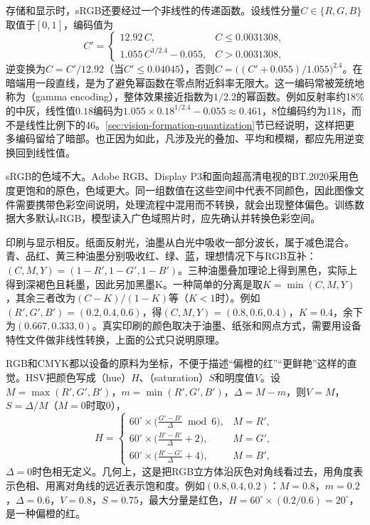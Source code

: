 存储和显示时，sRGB还要经过一个非线性的传递函数。设线性分量$C\in\{R,G,B\}$取值于$[0,1]$，编码值为
\begin{equation}
  C'=\begin{cases}
    12.92\,C, & C\le0.0031308,\\
    1.055\,C^{1/2.4}-0.055, & C>0.0031308,
  \end{cases}
  \label{eq:vision-formation-srgb}
\end{equation}
逆变换为$C=C'/12.92$（当$C'\le0.04045$），否则$C=\bigl((C'+0.055)/1.055\bigr)^{2.4}$。在暗端用一段直线，是为了避免幂函数在零点附近斜率无限大。这一编码常被笼统地称为（gamma encoding），整体效果接近指数为$1/2.2$的幂函数。例如反射率约18\%的中灰，线性值$0.18$编码为$1.055\times0.18^{1/2.4}-0.055\approx0.461$，8位编码约为118，而不是线性比例下的46。\ref{sec:vision-formation-quantization}节已经说明，这样把更多编码留给了暗部。也正因为如此，凡涉及光的叠加、平均和模糊，都应先用逆变换回到线性值。

sRGB的色域不大。Adobe RGB、Display P3和面向超高清电视的BT.2020采用色度更饱和的原色，色域更大。同一组数值在这些空间中代表不同颜色，因此图像文件需要携带色彩空间说明，处理流程中混用而不转换，就会出现整体偏色。训练数据大多默认sRGB，模型读入广色域照片时，应先确认并转换色彩空间。

印刷与显示相反。纸面反射光，油墨从白光中吸收一部分波长，属于减色混合。青、品红、黄三种油墨分别吸收红、绿、蓝，理想情况下与RGB互补：$(C,M,Y)=(1-R',1-G',1-B')$。三种油墨叠加理论上得到黑色，实际上得到深褐色且耗墨，因此另加黑墨K。一种简单的分离是取$K=\min(C,M,Y)$，其余三者改为$(C-K)/(1-K)$等（$K<1$时）。例如$(R',G',B')=(0.2,0.4,0.6)$，得$(C,M,Y)=(0.8,0.6,0.4)$，$K=0.4$，余下为$(0.667,0.333,0)$。真实印刷的颜色取决于油墨、纸张和网点方式，需要用设备特性文件做非线性转换，上面的公式只说明原理。

RGB和CMYK都以设备的原料为坐标，不便于描述“偏橙的红”“更鲜艳”这样的直觉。HSV把颜色写成（hue）$H$、（saturation）$S$和明度值$V$。设$M=\max(R',G',B')$，$m=\min(R',G',B')$，$\Delta=M-m$，则$V=M$，$S=\Delta/M$（$M=0$时取0），
\begin{equation}
  H=\begin{cases}
    60^\circ\times\bigl(\tfrac{G'-B'}{\Delta}\bmod 6\bigr), & M=R',\\
    60^\circ\times\bigl(\tfrac{B'-R'}{\Delta}+2\bigr), & M=G',\\
    60^\circ\times\bigl(\tfrac{R'-G'}{\Delta}+4\bigr), & M=B',
  \end{cases}
  \label{eq:vision-formation-hsv}
\end{equation}
$\Delta=0$时色相无定义。几何上，这是把RGB立方体沿灰色对角线看过去，用角度表示色相、用离对角线的远近表示饱和度。例如$(0.8,0.4,0.2)$：$M=0.8$，$m=0.2$，$\Delta=0.6$，$V=0.8$，$S=0.75$，最大分量是红色，$H=60^\circ\times(0.2/0.6)=20^\circ$，是一种偏橙的红。

